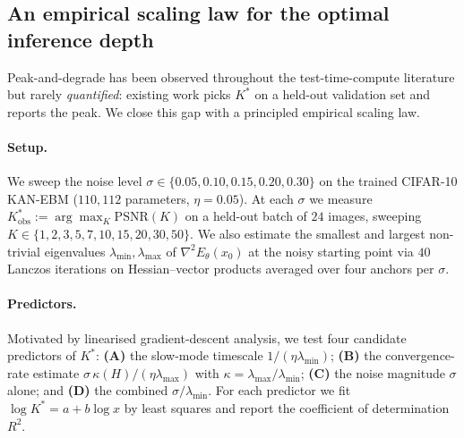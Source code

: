 \documentclass{article}
\begin{document}
\subsection{An empirical scaling law for the optimal inference depth}
\label{sec:kstar}

Peak-and-degrade has been observed throughout the test-time-compute literature
but rarely \emph{quantified}: existing work picks $K^{*}$ on a held-out
validation set and reports the peak. We close this gap with a principled
empirical scaling law.

\paragraph{Setup.} We sweep the noise level $\sigma{\in}\{0.05, 0.10, 0.15, 0.20,
0.30\}$ on the trained CIFAR-10 KAN-EBM ($110{,}112$ parameters,
$\eta{=}0.05$). At each $\sigma$ we measure
$K^{*}_{\text{obs}}{:=}\arg\max_{K}\mathrm{PSNR}(K)$ on a held-out batch of $24$
images, sweeping $K{\in}\{1,2,3,5,7,10,15,20,30,50\}$. We also estimate the
smallest and largest non-trivial eigenvalues $\lambda_{\min}, \lambda_{\max}$ of
$\nabla^{2}E_\theta(x_0)$ at the noisy starting point via $40$ Lanczos
iterations on Hessian--vector products averaged over four anchors per $\sigma$.

\paragraph{Predictors.} Motivated by linearised gradient-descent analysis, we
test four candidate predictors of $K^{*}$:
\textbf{(A)} the slow-mode timescale $1/(\eta\lambda_{\min})$;
\textbf{(B)} the convergence-rate estimate
$\sigma\,\kappa(H)/(\eta\lambda_{\max})$ with
$\kappa{=}\lambda_{\max}/\lambda_{\min}$;
\textbf{(C)} the noise magnitude $\sigma$ alone; and
\textbf{(D)} the combined $\sigma/\lambda_{\min}$.
For each predictor we fit $\log K^{*} = a + b\log x$ by least squares and report
the coefficient of determination $R^{2}$.
\end{document}
